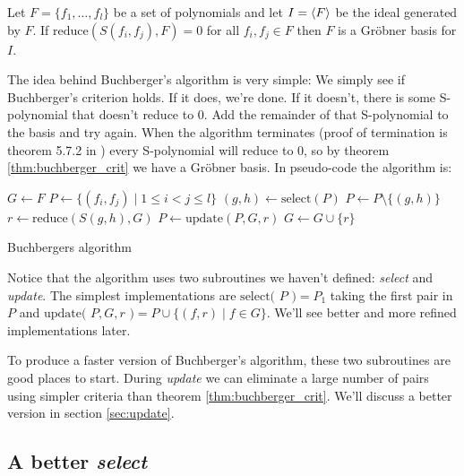 \documentclass{article}
\theoremstyle{changedot}
\theoremstyle{changedotbreak}
\theoremstyle{nonumberplain}
\DeclarePairedDelimiter{\tuple}{\langle}{\rangle}
\begin{document}
\begin{theorem}\label{thm:buchberger_crit}
Let $F = \{f_{1}, \dots, f_{l}\}$ be a set of polynomials and let $I = \tuple F$ be the ideal generated by $F$. If $\text{reduce}(S(f_{i}, f_{j}), F) = 0$ for all $f_{i}, f_{j} \in F$ then $F$ is a Gröbner basis for $I$.
\end{theorem}

The idea behind Buchberger's algorithm is very simple: We simply see if Buchberger's criterion holds. If it does, we're done. If it doesn't, there is some S-polynomial that doesn't reduce to 0. Add the remainder of that S-polynomial to the basis and try again. When the algorithm terminates (proof of termination is theorem 5.7.2 in \cite{NL}) every S-polynomial will reduce to 0, so by theorem \ref{thm:buchberger_crit} we have a Gröbner basis. In pseudo-code the algorithm is:

\begin{algorithm}[H]
\DontPrintSemicolon

  $G \leftarrow F$ \;
  $P \leftarrow \{(f_{i}, f_{j}) \mid 1 \leq i < j \leq l\}$ \;
  {
    $(g, h) \leftarrow \text{select}(P)$ \;
    $P \leftarrow P \setminus \{(g, h)\}$ \;
    $r \leftarrow \text{reduce}(S(g, h), G)$ \;
    {
      $P \leftarrow \text{update}(P, G, r)$ \;
      $G \leftarrow G \cup \{r\}$ \;
    }
  }

\caption{Buchbergers algorithm}
\end{algorithm}

Notice that the algorithm uses two subroutines we haven't defined: \emph{select} and \emph{update}. The simplest implementations are $\text{select( $P$ )} = P_{1}$ taking the first pair in $P$ and $\text{update( $P, G, r$ )} = P \cup \{(f, r) \mid f \in G\}$. We'll see better and more refined implementations later.

To produce a faster version of Buchberger's algorithm, these two subroutines are good places to start. During \emph{update} we can eliminate a large number of pairs using simpler criteria than theorem \ref{thm:buchberger_crit}. We'll discuss a better version in section \ref{sec:update}.

\subsection{A better \emph{select}} \label{sec:select}
\end{document}
